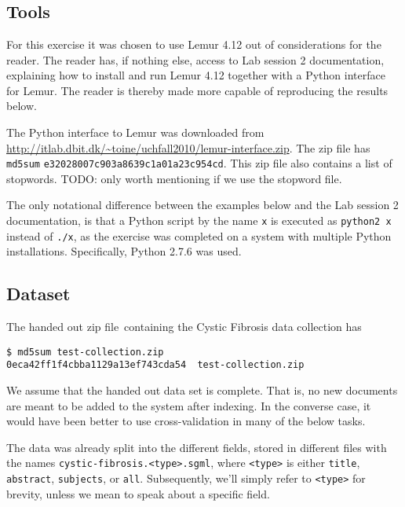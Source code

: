 
\section{}

\subsection*{Tools}

For this exercise it was chosen to use Lemur 4.12 out of considerations for the
reader. The reader has, if nothing else, access to Lab session 2 documentation,
explaining how to install and run Lemur 4.12 together with a Python interface
for Lemur. The reader is thereby made more capable of reproducing the results
below.

The Python interface to Lemur was downloaded from
\url{http://itlab.dbit.dk/~toine/uchfall2010/lemur-interface.zip}. The zip file
has \texttt{md5sum} \lstinline$e32028007c903a8639c1a01a23c954cd$. This zip file
also contains a list of stopwords. TODO: only worth mentioning if we use the
stopword file.

The only notational difference between the examples below and the Lab session 2
documentation, is that a Python script by the name \lstinline$x$ is executed as
\lstinline$python2 x$ instead of \lstinline$./x$, as the exercise was completed
on a system with multiple Python installations. Specifically, Python 2.7.6 was
used.

\subsection*{Dataset}

The handed out zip file\footnotemark~containing the Cystic Fibrosis data
collection has


\begin{lstlisting}
$ md5sum test-collection.zip 
0eca42ff1f4cbba1129a13ef743cda54  test-collection.zip
\end{lstlisting}

We assume that the handed out data set is complete. That is, no new documents
are meant to be added to the system after indexing. In the converse case, it
would have been better to use cross-validation in many of the below tasks.

The data was already split into the different fields, stored in different files
with the names \lstinline$cystic-fibrosis.<type>.sgml$, where
\lstinline$<type>$ is either \lstinline$title$, \lstinline$abstract$,
\lstinline$subjects$, or \lstinline$all$. Subsequently, we'll simply refer to
\lstinline$<type>$ for brevity, unless we mean to speak about a specific field.

